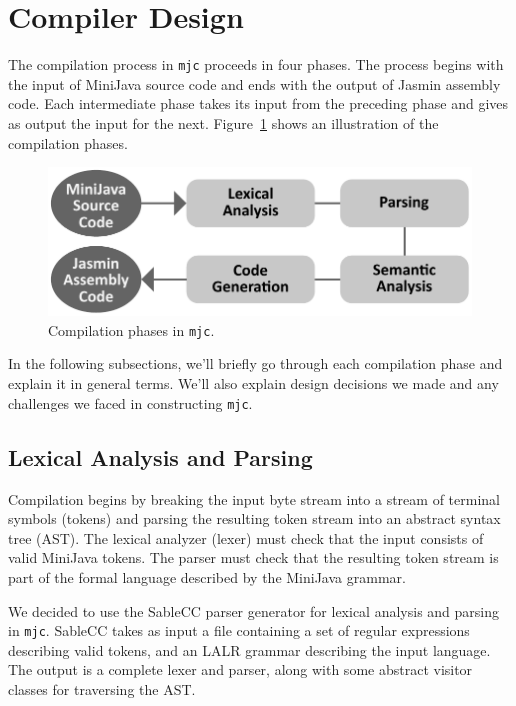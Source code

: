 \documentclass[a4paper,11pt]{article}
\begin{document}
\section{Compiler Design}

\label{sec:design}

The compilation process in \texttt{mjc} proceeds in four phases. The process begins with
the input of MiniJava source code and ends with the output of Jasmin assembly code.
Each intermediate phase takes its input from the preceding phase and gives as
output the input for the next. Figure~\ref{fig:compiler_phases} shows an illustration
of the compilation phases.

\begin{figure}[h!]
    \centering
    \includegraphics[width=0.8\linewidth]{figures/compiler_phases.pdf}
    \caption{Compilation phases in \texttt{mjc}.}
    \label{fig:compiler_phases}
\end{figure}

In the following subsections, we'll briefly go through each compilation phase and
explain it in general terms. We'll also explain design decisions we made and any
challenges we faced in constructing \texttt{mjc}.

\subsection{Lexical Analysis and Parsing}

Compilation begins by breaking the input byte stream into a stream of terminal
symbols (tokens) and parsing the resulting token stream into an abstract syntax
tree (AST). The lexical analyzer (lexer) must check that the input consists of
valid MiniJava tokens. The parser must check that the resulting token stream is
part of the formal language described by the MiniJava grammar.

We decided to use the SableCC \cite{sablecc} parser generator for lexical analysis
and parsing in \texttt{mjc}. SableCC takes as input a file containing a set of
regular expressions describing valid tokens, and an LALR grammar describing the
input language. The output is a complete lexer and parser, along with some abstract
visitor classes for traversing the AST.
\end{document}
